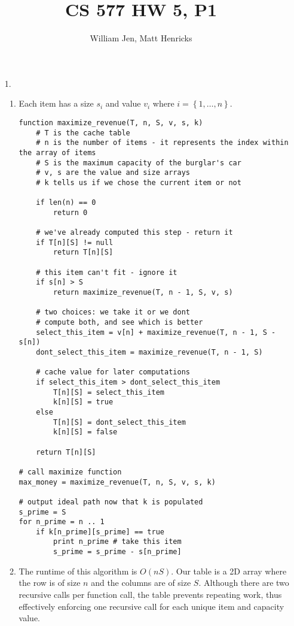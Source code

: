 \documentclass{article}
\title{CS 577 HW 5, P1}
\author{William Jen, Matt Henricks}
\date{}
\begin{document}
\maketitle

\begin{enumerate}
    \item[1.]
        \begin{enumerate}
            \item
                Each item has a size $s_i$ and value $v_i$ where $i = \left\{1, \ldots, n\right\}$.
                \begin{verbatim}
function maximize_revenue(T, n, S, v, s, k)
    # T is the cache table
    # n is the number of items - it represents the index within the array of items
    # S is the maximum capacity of the burglar's car
    # v, s are the value and size arrays
    # k tells us if we chose the current item or not
    
    if len(n) == 0
        return 0
    
    # we've already computed this step - return it
    if T[n][S] != null
        return T[n][S]
    
    # this item can't fit - ignore it
    if s[n] > S
        return maximize_revenue(T, n - 1, S, v, s)
    
    # two choices: we take it or we dont
    # compute both, and see which is better
    select_this_item = v[n] + maximize_revenue(T, n - 1, S - s[n])
    dont_select_this_item = maximize_revenue(T, n - 1, S)
    
    # cache value for later computations
    if select_this_item > dont_select_this_item
        T[n][S] = select_this_item
        k[n][S] = true
    else
        T[n][S] = dont_select_this_item
        k[n][S] = false
    
    return T[n][S]
    
# call maximize function
max_money = maximize_revenue(T, n, S, v, s, k)

# output ideal path now that k is populated
s_prime = S
for n_prime = n .. 1
    if k[n_prime][s_prime] == true
        print n_prime # take this item
        s_prime = s_prime - s[n_prime]
                \end{verbatim}

            \item The runtime of this algorithm is $O\left(nS\right)$. Our table is a 2D array where the row
                is of size $n$ and the columns are of size $S$. Although there are two recursive calls per function call,
                the table prevents repeating work, thus effectively enforcing one recursive call for each unique item and
                capacity value.
                

\end{enumerate}
\end{enumerate}
\end{document}
